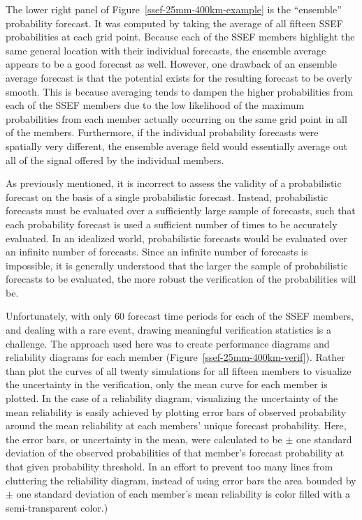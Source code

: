 The lower right panel of \mbox{Figure \ref{ssef-25mm-400km-example}} is the ``ensemble'' probability forecast.
It was computed by taking the average of all fifteen SSEF probabilities at each grid point.
Because each of the SSEF members highlight the same general location with their individual forecasts, the ensemble average appears to be a good forecast as well.
However, one drawback of an ensemble average forecast is that the potential exists for the resulting forecast to be overly smooth.
This is because averaging tends to dampen the higher probabilities from each of the SSEF members due to the low likelihood of the maximum probabilities from each member actually occurring on the same grid point in all of the members.
Furthermore, if the individual probability forecasts were spatially very different, the ensemble average field would essentially average out all of the signal offered by the individual members.


As previously mentioned, it is incorrect to assess the validity of a probabilistic forecast on the basis of a single probabilistic forecast.
Instead, probabilistic forecasts must be evaluated over a sufficiently large sample of forecasts, such that each probability forecast is used a sufficient number of times to be accurately evaluated.
In an idealized world, probabilistic forecasts would be evaluated over an infinite number of forecasts.
Since an infinite number of forecasts is impossible, it is generally understood that the larger the sample of probabilistic forecasts to be evaluated, the more robust the verification of the probabilities will be.


Unfortunately, with only 60 forecast time periods for each of the SSEF members, and dealing with a rare event, drawing meaningful verification statistics is a challenge.
The approach used here was to create performance diagrams and reliability diagrams for each member (\mbox{Figure \ref{ssef-25mm-400km-verif}}).
Rather than plot the curves of all twenty simulations for all fifteen members to visualize the uncertainty in the verification, only the mean curve for each member is plotted.
In the case of a reliability diagram, visualizing the uncertainty of the mean reliability is easily achieved by plotting error bars of observed probability around the mean reliability at each members' unique forecast probability.
Here, the error bars, or uncertainty in the mean, were calculated to be $\pm$ one standard deviation of the observed probabilities of that member's forecast probability at that given probability threshold.
In an effort to prevent too many lines from cluttering the reliability diagram, instead of using error bars the area bounded by $\pm$ one standard deviation of each member's mean reliability is color filled with a semi-transparent color.)


